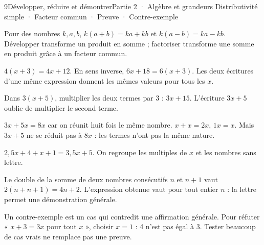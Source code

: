 \begin{ouverture}[calcul]{9}{Développer, réduire et démontrer}{Partie 2 · Algèbre et grandeurs}
{Distributivité simple · Facteur commun · Preuve · Contre-exemple}
\end{ouverture}
\pagestyle{otMain}\essentiel\fontsize{11}{15}\selectfont
{}\label{cours-9-1}
\begin{propriete}Pour des nombres $k,a,b$, $k(a+b)=ka+kb$ et $k(a-b)=ka-kb$. Développer transforme un produit en somme ; factoriser transforme une somme en produit grâce à un facteur commun.\end{propriete}
\label{fig-cours-9-1-cours-distrib}

\begin{exemple}$4(x+3)=4x+12$. En sens inverse, $6x+18=6(x+3)$. Les deux écritures d’une même expression donnent les mêmes valeurs pour tous les $x$.\end{exemple}
\begin{attention}Dans $3(x+5)$, multiplier les deux termes par 3 : $3x+15$. L’écriture $3x+5$ oublie de multiplier le second terme.\end{attention}
\clearpage
{}\label{cours-9-2}
\begin{propriete}$3x+5x=8x$ car on réunit huit fois le même nombre. $x+x=2x$, $1x=x$. Mais $3x+5$ ne se réduit pas à $8x$ : les termes n’ont pas la même nature.\end{propriete}
\begin{exemple}$2{,}5x+4+x+1=3{,}5x+5$. On regroupe les multiples de $x$ et les nombres sans lettre.\end{exemple}
\begin{savoirfaire}Le double de la somme de deux nombres consécutifs $n$ et $n+1$ vaut $2(n+n+1)=4n+2$. L’expression obtenue vaut pour tout entier $n$ : la lettre permet une démonstration générale.\end{savoirfaire}
\begin{definition}Un contre-exemple est un cas qui contredit une affirmation générale. Pour réfuter « $x+3=3x$ pour tout $x$ », choisir $x=1$ : 4 n’est pas égal à 3. Tester beaucoup de cas vrais ne remplace pas une preuve.\end{definition}

